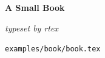 \null
\vskip 120pt
\centerline{\bf A Small Book}
\bigskip
\centerline{\it typeset by rtex}
\vfill
\centerline{\tt examples/book/book.tex}
\eject




\bye
